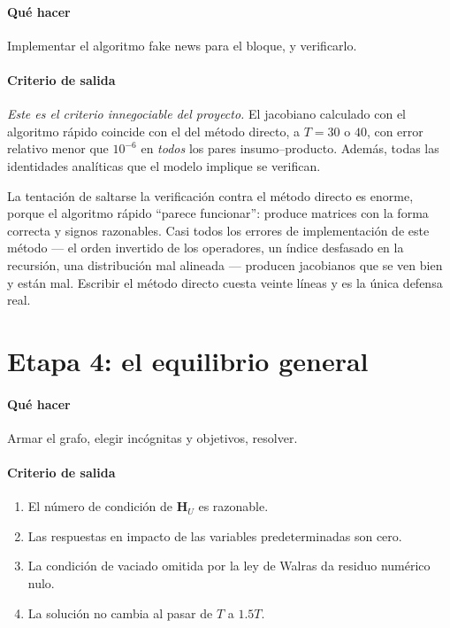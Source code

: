 \paragraph{Qué hacer} Implementar el algoritmo fake news para el bloque, y
verificarlo.

\paragraph{Criterio de salida} \emph{Este es el criterio innegociable del
proyecto.} El jacobiano calculado con el algoritmo rápido coincide con el del
método directo, a $T=30$ o $40$, con error relativo menor que $10^{-6}$ en
\emph{todos} los pares insumo--producto. Además, todas las identidades
analíticas que el modelo implique se verifican.

\begin{trampa}
La tentación de saltarse la verificación contra el método directo es enorme,
porque el algoritmo rápido ``parece funcionar'': produce matrices con la forma
correcta y signos razonables. Casi todos los errores de implementación de este
método --- el orden invertido de los operadores, un índice desfasado en la
recursión, una distribución mal alineada --- producen jacobianos que se ven bien
y están mal. Escribir el método directo cuesta veinte líneas y es la única
defensa real.
\end{trampa}

\section{Etapa 4: el equilibrio general}

\paragraph{Qué hacer} Armar el grafo, elegir incógnitas y objetivos, resolver.

\paragraph{Criterio de salida}
\begin{enumerate}[leftmargin=1.4em,itemsep=1pt]
\item El número de condición de $\mathbf{H}_U$ es razonable.
\item Las respuestas en impacto de las variables predeterminadas son cero.
\item La condición de vaciado omitida por la ley de Walras da residuo numérico
nulo.
\item La solución no cambia al pasar de $T$ a $1.5T$.
\end{enumerate}


